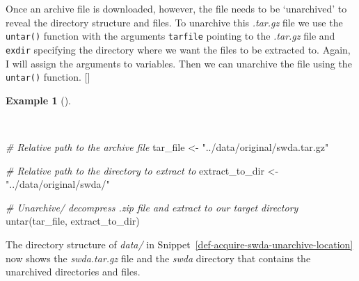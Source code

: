 \documentclass[
  letterpaper,
  krantz1]{latex/krantz-mod}
\newenvironment{Shaded}{\begin{snugshade}}{\end{snugshade}}
\newcommand{\CommentTok}[1]{\textcolor[rgb]{0.00,0.00,0.00}{\textit{#1}}}
\newcommand{\FunctionTok}[1]{\textcolor[rgb]{0.00,0.00,0.00}{#1}}
\newcommand{\NormalTok}[1]{\textcolor[rgb]{0.00,0.00,0.00}{#1}}
\newcommand{\OtherTok}[1]{\textcolor[rgb]{0.00,0.00,0.00}{#1}}
\newcommand{\StringTok}[1]{\textcolor[rgb]{0.00,0.00,0.00}{#1}}
\newcommand{\cindex}[1]{%
  \StrSubstitute{#1}{_}{\_}[\temp]%
  \index{\temp}%
}
\theoremstyle{definition}
\theoremstyle{definition}
\newtheorem{example}{Example}[chapter]
\theoremstyle{remark}
\begin{document}
Once an archive file is downloaded, however, the file needs to be
`unarchived' to reveal the directory structure and files. To unarchive
this \emph{.tar.gz} file we use the \texttt{untar()} function with the
arguments \texttt{tarfile} pointing to the \emph{.tar.gz} file and
\texttt{exdir} specifying the directory where we want the files to be
extracted to. Again, I will assign the arguments to variables. Then we
can unarchive the file using the \texttt{untar()}
function.\cindex{untar()}

\begin{example}[]\protect\hypertarget{exm-acquire-swda-archive-file}{}\label{exm-acquire-swda-archive-file}

~

\begin{Shaded}
\begin{Highlighting}[numbers=left,,]
\CommentTok{\# Relative path to the archive file}
\NormalTok{tar\_file }\OtherTok{\textless{}{-}} \StringTok{"../data/original/swda.tar.gz"}

\CommentTok{\# Relative path to the directory to extract to}
\NormalTok{extract\_to\_dir }\OtherTok{\textless{}{-}} \StringTok{"../data/original/swda/"}

\CommentTok{\# Unarchive/ decompress .zip file and extract to our target directory}
\FunctionTok{untar}\NormalTok{(tar\_file, extract\_to\_dir)}
\end{Highlighting}
\end{Shaded}

\end{example}

The directory structure of \emph{data/} in
Snippet~\ref{def-acquire-swda-unarchive-location} now shows the
\emph{swda.tar.gz} file and the \emph{swda} directory that contains the
unarchived directories and files.
\end{document}
